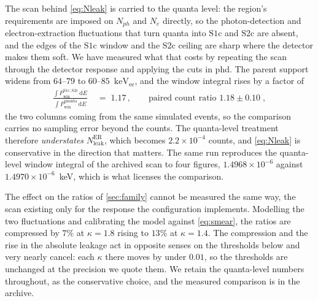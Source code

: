 \documentclass[11pt,a4paper]{article}
\newcommand{\keVee}{\ensuremath{\mathrm{keV_{ee}}}}
\begin{document}
The scan behind \cref{eq:Nleak} is carried to the quanta level: the region's
requirements are imposed on \(N_{ph}\) and \(N_e\) directly, so the
photon-detection and electron-extraction fluctuations that turn quanta into
\(\mathrm{S1c}\) and \(\mathrm{S2c}\) are absent, and the edges of the
\(\mathrm{S1c}\) window and the \(\mathrm{S2c}\) ceiling are sharp where the
detector makes them soft. We have measured what that costs by repeating the
scan through the detector response and applying the cuts in phd. The parent
support widens from \(64\)--\(79\) to \(60\)--\(85\)~\keVee, and the
window integral rises by a factor of
\begin{align}
    \label{eq:smear}
    \frac{\int P_\mathrm{win}^{\mathrm{S1c,S2c}}\,\mathrm{d}E}
         {\int P_\mathrm{win}^{\mathrm{quanta}}\,\mathrm{d}E}\;&=\;1.17\,,
         \qquad\text{paired count ratio } 1.18\pm0.10\;,
\end{align}
the two columns coming from the same simulated events, so the comparison
carries no sampling error beyond the counts. The quanta-level treatment
therefore \emph{understates} \(N^\mathrm{ER}_\mathrm{leak}\), which becomes
\(2.2\times10^{-4}\) counts, and \cref{eq:Nleak} is conservative in the
direction that matters. The same run reproduces the quanta-level window
integral of the archived scan to four figures, \(1.4968\times10^{-6}\)
against \(1.4970\times10^{-6}\)~keV, which is what licenses the comparison.

The effect on the ratios of \cref{sec:family} cannot be measured the same
way, the scan existing only for the response the configuration implements.
Modelling the two fluctuations and calibrating the model against
\cref{eq:smear}, the ratios are compressed by \(7\%\) at \(\kappa=1.8\)
rising to \(13\%\) at \(\kappa=1.4\). The compression and the rise in the
absolute leakage act in opposite senses on the thresholds below and very
nearly cancel: each \(\kappa\) there moves by under \(0.01\), so the
thresholds are unchanged at the precision we quote them. We retain the
quanta-level numbers throughout, as the conservative choice, and the
measured comparison is in the archive.
\end{document}
